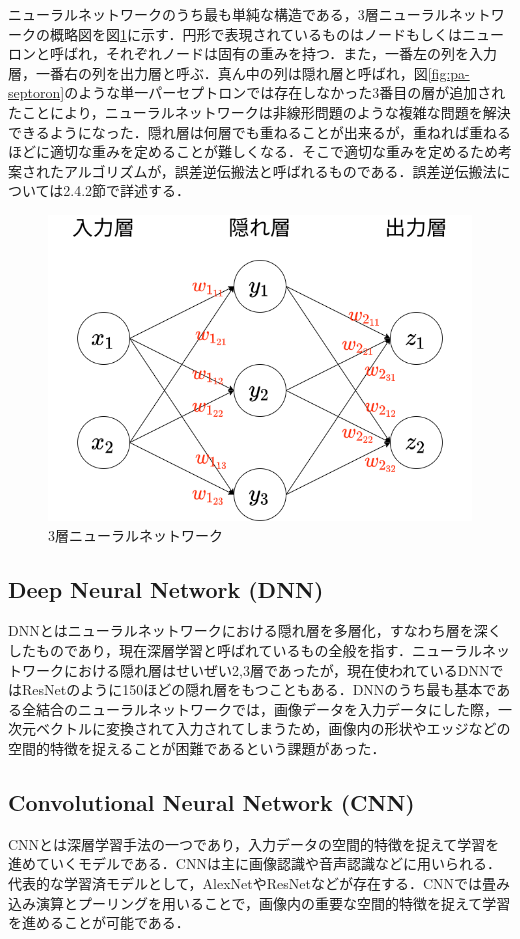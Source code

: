 \documentclass[a4j, 11pt]{jreport}
\begin{document}
ニューラルネットワークのうち最も単純な構造である，3層ニューラルネットワークの概略図を図\ref{fig:3nn}に示す．円形で表現されているものはノードもしくはニューロンと呼ばれ，それぞれノードは固有の重みを持つ．また，一番左の列を入力層，一番右の列を出力層と呼ぶ．真ん中の列は隠れ層と呼ばれ，図\ref{fig:pa-septoron}のような単一パーセプトロンでは存在しなかった3番目の層が追加されたことにより，ニューラルネットワークは非線形問題のような複雑な問題を解決できるようになった．隠れ層は何層でも重ねることが出来るが，重ねれば重ねるほどに適切な重みを定めることが難しくなる．そこで適切な重みを定めるため考案されたアルゴリズムが，誤差逆伝搬法と呼ばれるものである．誤差逆伝搬法については2.4.2節で詳述する．

\begin{figure}[H]
 \centering
 \includegraphics[width=0.7\hsize, keepaspectratio]{images/drawio/3nn.png}
 \caption{3層ニューラルネットワーク}
 \label{fig:3nn}
\end{figure}

\subsection{Deep Neural Network (DNN)}
DNNとはニューラルネットワークにおける隠れ層を多層化，すなわち層を深くしたものであり，現在深層学習と呼ばれているもの全般を指す．ニューラルネットワークにおける隠れ層はせいぜい2,3層であったが，現在使われているDNNではResNet\cite{He2016}のように150ほどの隠れ層をもつこともある．DNNのうち最も基本である全結合のニューラルネットワークでは，画像データを入力データにした際，一次元ベクトルに変換されて入力されてしまうため，画像内の形状やエッジなどの空間的特徴を捉えることが困難であるという課題があった．

\subsection{Convolutional Neural Network (CNN)}
CNNとは深層学習手法の一つであり，入力データの空間的特徴を捉えて学習を進めていくモデルである．CNNは主に画像認識や音声認識などに用いられる．代表的な学習済モデルとして，AlexNet\cite{Krizhevsky2012}やResNet\cite{He2016}などが存在する．CNNでは畳み込み演算とプーリングを用いることで，画像内の重要な空間的特徴を捉えて学習を進めることが可能である．
\end{document}
